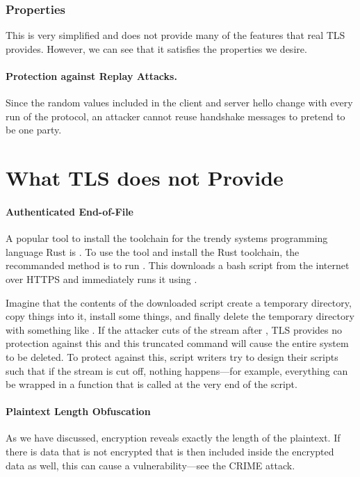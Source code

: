 \subsubsection{Properties}
This is very simplified and does not provide many of the features that real TLS provides. However, we can see that it satisfies the properties we desire. 

\paragraph{Protection against Replay Attacks.} Since the random values included in the client and server hello change with every run of the protocol, an attacker cannot reuse handshake messages to pretend to be one party.


\section{What TLS does not Provide}

\paragraph{Authenticated End-of-File}
A popular tool to install the toolchain for the trendy systems programming language Rust is . To use the tool and install the Rust toolchain, the recommanded method is to run . This downloads a bash script from the internet over HTTPS and immediately runs it using .

Imagine that the contents of the downloaded script create a temporary directory, copy things into it, install some things, and finally delete the temporary directory with something like . If the attacker cuts of the stream after , TLS provides no protection against this and this truncated command will cause the entire system to be deleted. To protect against this, script writers try to design their scripts such that if the stream is cut off, nothing happens---for example, everything can be wrapped in a function that is called at the very end of the script.

\paragraph{Plaintext Length Obfuscation}
As we have discussed, encryption reveals exactly the length of the plaintext. If there is data that is not encrypted that is then included inside the encrypted data as well, this can cause a vulnerability---see the CRIME attack.
